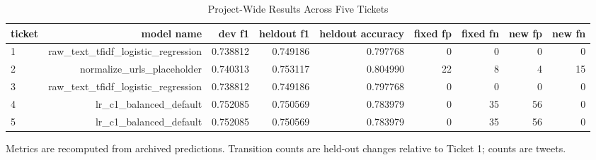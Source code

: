 \begin{table}[t]
\centering
\caption{Project-Wide Results Across Five Tickets}
\label{tab:five_ticket_summary}
\begin{adjustbox}{max width=\textwidth}
\scriptsize
\begin{tabular}{lrrrrrrrr}
\hline
ticket & model name & dev f1 & heldout f1 & heldout accuracy & fixed fp & fixed fn & new fp & new fn \\
\hline
1 & raw\_text\_tfidf\_logistic\_regression & 0.738812 & 0.749186 & 0.797768 & 0 & 0 & 0 & 0 \\
2 & normalize\_urls\_placeholder & 0.740313 & 0.753117 & 0.804990 & 22 & 8 & 4 & 15 \\
3 & raw\_text\_tfidf\_logistic\_regression & 0.738812 & 0.749186 & 0.797768 & 0 & 0 & 0 & 0 \\
4 & lr\_c1\_balanced\_default & 0.752085 & 0.750569 & 0.783979 & 0 & 35 & 56 & 0 \\
5 & lr\_c1\_balanced\_default & 0.752085 & 0.750569 & 0.783979 & 0 & 35 & 56 & 0 \\
\hline
\end{tabular}
\end{adjustbox}
\par\footnotesize{Metrics are recomputed from archived predictions. Transition counts are held-out changes relative to Ticket 1; counts are tweets.}
\end{table}
